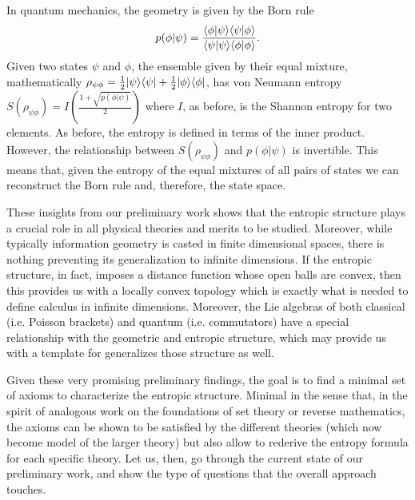 In quantum mechanics, the geometry is given by the Born rule
\begin{equation}
	p(\phi|\psi) = \frac{\langle \phi | \psi \rangle\langle \psi | \phi \rangle}{\langle \psi | \psi \rangle\langle \phi | \phi \rangle}.
\end{equation}
Given two states $\psi$ and $\phi$, the ensemble given by their equal mixture, mathematically $\rho_{\psi\phi} = \frac{1}{2}|\psi\rangle\langle\psi|+\frac{1}{2}|\phi\rangle\langle\phi|$,  has von Neumann entropy $S(\rho_{\psi\phi}) = I\left(\frac{1 + \sqrt{p(\phi|\psi)}}{2} \right)$ where $I$, as before, is the Shannon entropy for two elements. As before, the entropy is defined in terms of the inner product. However, the relationship between $S(\rho_{\psi\phi})$ and $p(\phi|\psi)$ is invertible. This means that, given the entropy of the equal mixtures of all pairs of states we can reconstruct the Born rule and, therefore, the state space.

These insights from our preliminary work shows that the entropic structure plays a crucial role in all physical theories and merits to be studied. Moreover, while typically information geometry is casted in finite dimensional spaces, there is nothing preventing its generalization to infinite dimensions. If the entropic structure, in fact, imposes a distance function whose open balls are convex, then this provides us with a locally convex topology which is exactly what is needed to define calculus in infinite dimensions. Moreover, the Lie algebras of both classical (i.e. Poisson brackets) and quantum (i.e. commutators) have a special relationship with the geometric and entropic structure, which may provide us with a template for generalizes those structure as well. 

Given these very promising preliminary findings, the goal is to find a minimal set of axioms to characterize the entropic structure. Minimal in the sense that, in the spirit of analogous work on the foundations of set theory or reverse mathematics, the axioms can be shown to be satisfied by the different theories (which now become model of the larger theory) but also allow to rederive the entropy formula for each specific theory. Let us, then, go through the current state of our preliminary work, and show the type of questions that the overall approach touches.



